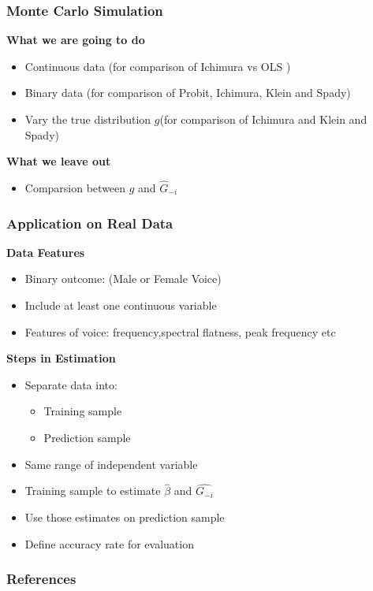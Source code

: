 \documentclass{beamer}
\begin{document}
\begin{frame}[t]
	\frametitle{Monte Carlo Simulation}

	\textbf{What we are going to do}
	\begin{itemize}
		\item Continuous data (for comparison of Ichimura vs OLS )
		\item Binary data (for comparison of Probit, Ichimura, Klein and Spady)
           \item Vary the true distribution $g$(for comparison of Ichimura and Klein and Spady)
	\end{itemize}
	\textbf{What we leave out}
	\begin{itemize}
		\item Comparsion between $g$ and $ \hat{G}_{-i} $
	\end{itemize}
	\note{~}
\end{frame}


\begin{frame}
	\frametitle{Application on Real Data}
	
	\textbf{Data Features}
	\begin{itemize}
		\item Binary outcome: (Male or Female Voice)
		\item Include at least one continuous variable
		\item Features of voice: frequency,spectral flatness, peak frequency etc
	\end{itemize}
	\textbf{Steps in Estimation}
	\begin{itemize}
		\item Separate data into:
		\begin{itemize}
			\item Training sample
			\item Prediction sample
		\end{itemize}
		\item Same range of independent variable 
		\item Training sample to estimate $\hat{\beta}$ and $\hat{G_{-i}}$
		\item Use those estimates on prediction sample
		\item Define accuracy rate for evaluation
	\end{itemize}
	\note{~}
\end{frame}


\begin{frame}[allowframebreaks]
    \frametitle{References}
    \renewcommand{\bibfont}{\normalfont\footnotesize}
    \printbibliography
\end{frame}
\end{document}
